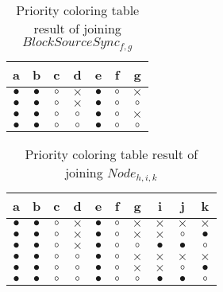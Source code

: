 \begin{BehExample}
\begin{table}
	\noindent
	\begin{tabular}{|c|c|c|c|c|c|c|}
		\hline
		a&b&c&d&e&f&g\\ 
		\hline
		$\bullet$ & $\bullet$ & $\circ$ & $\times$ & $\bullet$ & $\circ$ & $\times$ \\ 
		\hline
		$\bullet$ & $\bullet$ & $\circ$ & $\times$ & $\bullet$ & $\circ$ & $\circ$ \\ 
		\hline
		$\bullet$ & $\bullet$ & $\circ$ & $\circ$ & $\bullet$ & $\circ$ & $\times$ \\ 
		\hline
		$\bullet$ & $\bullet$ & $\circ$ & $\circ$ & $\bullet$ & $\circ$ & $\circ$ \\ 
		\hline
	\end{tabular}
\caption{Priority coloring table result of joining $BlockSourceSync_{f,g}$}
\label{tab:x2}
\end{table}


\begin{table}
	\noindent
	\begin{tabular}{|c|c|c|c|c|c|c|c|c|c|}
		\hline
		a&b&c&d&e&f&g&i&j&k\\ 
		\hline
		$\bullet$ & $\bullet$ & $\circ$ & $\times$ & $\bullet$ & $\circ$ & $\times$ & $\times$ & $\times$ & $\times$ \\ 
		\hline
		$\bullet$ & $\bullet$ & $\circ$ & $\times$ & $\bullet$ & $\circ$ & $\times$ & $\times$ & $\circ$ & $\bullet$ \\ 
		\hline
		$\bullet$ & $\bullet$ & $\circ$ & $\times$ & $\bullet$ & $\circ$ & $\circ$ & $\bullet$ & $\bullet$ & $\circ$ \\ 
		\hline
		$\bullet$ & $\bullet$ & $\circ$ & $\circ$ & $\bullet$ & $\circ$ & $\times$ & $\times$ & $\times$ & $\times$ \\ 
		\hline
		$\bullet$ & $\bullet$ & $\circ$ & $\circ$ & $\bullet$ & $\circ$ & $\times$ & $\times$ & $\circ$ & $\bullet$ \\ 
		\hline
		$\bullet$ & $\bullet$ & $\circ$ & $\circ$ & $\bullet$ & $\circ$ & $\circ$ & $\bullet$ & $\bullet$ & $\circ$ \\ 
		\hline
	\end{tabular}
\caption{Priority coloring table result of joining $Node_{h,i,k}$}
\label{tab:x3}
\end{table} 


\end{BehExample}
